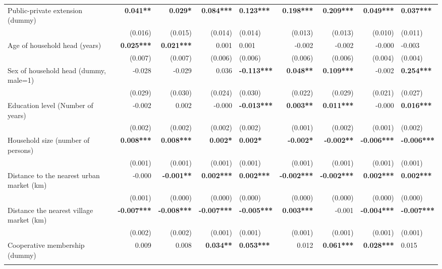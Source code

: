 \documentclass[
]{article}
\begin{document}
\begin{landscape}
\begin{longtable}[t]{lrrrlrrrl}
\endfoot
\bottomrule
\endlastfoot
Public-private extension (dummy) & \textbf{0.041**} & \textbf{0.029*} & \textbf{0.084***} & \textbf{0.123***} & \textbf{0.198***} & \textbf{0.209***} & \textbf{0.049***} & \textbf{0.037***}\\
 & (0.016) & (0.015) & (0.014) & (0.014) & (0.013) & (0.013) & (0.010) & (0.011)\\
Age of household head (years) & \textbf{0.025***} & \textbf{0.021***} & 0.001 & 0.001 & -0.002 & -0.002 & -0.000 & -0.003\\
 & (0.007) & (0.007) & (0.006) & (0.006) & (0.006) & (0.006) & (0.004) & (0.004)\\
Sex of household head (dummy, male=1) & -0.028 & -0.029 & 0.036 & \textbf{-0.113***} & \textbf{0.048**} & \textbf{0.109***} & -0.002 & \textbf{0.254***}\\
\addlinespace
 & (0.029) & (0.030) & (0.024) & (0.030) & (0.022) & (0.029) & (0.021) & (0.027)\\
Education level (Number of years) & -0.002 & 0.002 & -0.000 & \textbf{-0.013***} & \textbf{0.003**} & \textbf{0.011***} & -0.000 & \textbf{0.016***}\\
 & (0.002) & (0.002) & (0.002) & (0.002) & (0.001) & (0.002) & (0.001) & (0.002)\\
Household size (number of persons) & \textbf{0.008***} & \textbf{0.008***} & \textbf{0.002*} & \textbf{0.002*} & \textbf{-0.002*} & \textbf{-0.002**} & \textbf{-0.006***} & \textbf{-0.006***}\\
 & (0.001) & (0.001) & (0.001) & (0.001) & (0.001) & (0.001) & (0.001) & (0.001)\\
\addlinespace
Distance to the nearest urban market (km) & -0.000 & \textbf{-0.001**} & \textbf{0.002***} & \textbf{0.002***} & \textbf{-0.002***} & \textbf{-0.002***} & \textbf{0.002***} & \textbf{0.002***}\\
 & (0.001) & (0.000) & (0.000) & (0.000) & (0.000) & (0.000) & (0.000) & (0.000)\\
Distance the nearest village market (km) & \textbf{-0.007***} & \textbf{-0.008***} & \textbf{-0.007***} & \textbf{-0.005***} & \textbf{0.003***} & -0.001 & \textbf{-0.004***} & \textbf{-0.007***}\\
 & (0.002) & (0.002) & (0.001) & (0.001) & (0.001) & (0.001) & (0.001) & (0.001)\\
Cooperative membership (dummy) & 0.009 & 0.008 & \textbf{0.034**} & \textbf{0.053***} & 0.012 & \textbf{0.061***} & \textbf{0.028***} & 0.015\\
\addlinespace

\end{longtable}
\end{landscape}
\end{document}
